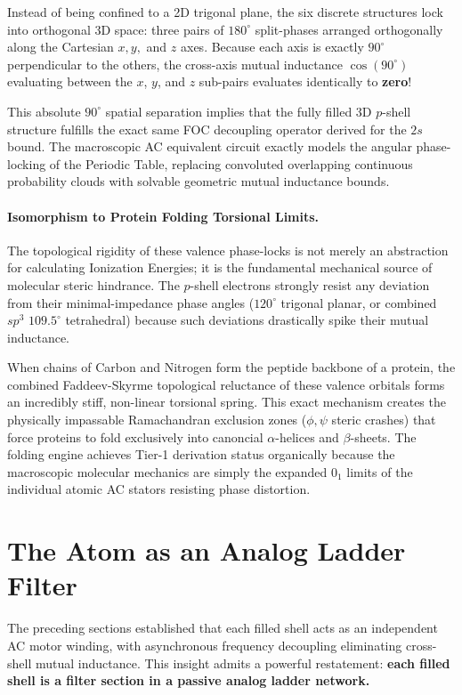 Instead of being confined to a 2D trigonal plane, the six discrete structures lock into orthogonal 3D space: three pairs of $180^\circ$ split-phases arranged orthogonally along the Cartesian $x, y,$ and $z$ axes. Because each axis is exactly $90^\circ$ perpendicular to the others, the cross-axis mutual inductance $\cos(90^\circ)$ evaluating between the $x$, $y$, and $z$ sub-pairs evaluates identically to \textbf{zero}!

This absolute $90^\circ$ spatial separation implies that the fully filled 3D $p$-shell structure fulfills the exact same FOC decoupling operator derived for the $2s$ bound. The macroscopic AC equivalent circuit exactly models the angular phase-locking of the Periodic Table, replacing convoluted overlapping continuous probability clouds with solvable geometric mutual inductance bounds.

\paragraph{Isomorphism to Protein Folding Torsional Limits.}
The topological rigidity of these valence phase-locks is not merely an abstraction for calculating Ionization Energies; it is the fundamental mechanical source of molecular steric hindrance. The $p$-shell electrons strongly resist any deviation from their minimal-impedance phase angles ($120^\circ$ trigonal planar, or combined $sp^3$ $109.5^\circ$ tetrahedral) because such deviations drastically spike their mutual inductance. 

When chains of Carbon and Nitrogen form the peptide backbone of a protein, the combined Faddeev-Skyrme topological reluctance of these valence orbitals forms an incredibly stiff, non-linear torsional spring. This exact mechanism creates the physically impassable Ramachandran exclusion zones ($\phi, \psi$ steric crashes) that force proteins to fold exclusively into canoncial $\alpha$-helices and $\beta$-sheets. The folding engine achieves Tier-1 derivation status organically because the macroscopic molecular mechanics are simply the expanded $0_1$ limits of the individual atomic AC stators resisting phase distortion.

\section{The Atom as an Analog Ladder Filter}
\label{sec:analog_ladder_filter}

The preceding sections established that each filled shell acts as an independent AC motor winding, with asynchronous frequency decoupling eliminating cross-shell mutual inductance. This insight admits a powerful restatement: \textbf{each filled shell is a filter section in a passive analog ladder network.}

